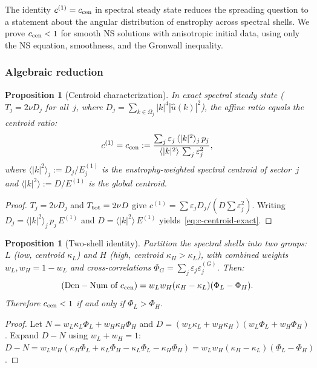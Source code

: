 \documentclass[11pt]{article}
\newtheorem{proposition}[theorem]{Proposition}
\theoremstyle{definition}
\begin{document}
The identity $c^{(1)} = c_{\rm cen}$ in spectral
steady state reduces the spreading question to a
statement about the angular distribution of enstrophy
across spectral shells.  We prove $c_{\rm cen}<1$
for smooth NS solutions with anisotropic initial
data, using only the NS equation, smoothness, and
the Gronwall inequality.

\subsubsection{Algebraic reduction}

\begin{proposition}[Centroid characterization]
\label{prop:c-centroid}
In exact spectral steady state
($T_j = 2\nu D_j$ for all~$j$, where
$D_j = \sum_{k\in\Omega_j}|k|^4|\hat u(k)|^2$),
the affine ratio equals the centroid ratio:
\begin{equation}\label{eq:c-centroid-exact}
c^{(1)} = c_{\rm cen} :=
\frac{\sum_j\varepsilon_j\,
\langle|k|^2\rangle_j\,p_j}
{\langle|k|^2\rangle\,
\sum_j\varepsilon_j^2},
\end{equation}
where
$\langle|k|^2\rangle_j := D_j/E_j^{(1)}$
is the enstrophy-weighted spectral centroid of
sector~$j$ and
$\langle|k|^2\rangle := D/E^{(1)}$ is the global
centroid.
\end{proposition}

\begin{proof}
$T_j = 2\nu D_j$ and $T_{\rm tot} = 2\nu D$ give
$c^{(1)} = \sum\varepsilon_j D_j/(D\sum\varepsilon_j^2)$.
Writing $D_j = \langle|k|^2\rangle_j\,p_j\,E^{(1)}$
and $D = \langle|k|^2\rangle\,E^{(1)}$
yields~\eqref{eq:c-centroid-exact}.
\end{proof}

\begin{proposition}[Two-shell identity]
\label{prop:two-shell}
Partition the spectral shells into two groups:
$L$ (low, centroid $\kappa_L$) and $H$ (high,
centroid $\kappa_H>\kappa_L$), with combined
weights $w_L,w_H=1-w_L$ and cross-correlations
$\Phi_G = \sum_j\varepsilon_j\varepsilon_j^{(G)}$.
Then:
\begin{equation}\label{eq:two-shell-id}
(\mathrm{Den}-\mathrm{Num}\text{ of }c_{\rm cen})
= w_L w_H(\kappa_H-\kappa_L)(\Phi_L-\Phi_H).
\end{equation}
Therefore $c_{\rm cen}<1$ if and only if $\Phi_L>\Phi_H$.
\end{proposition}

\begin{proof}
Let $N = w_L\kappa_L\Phi_L+w_H\kappa_H\Phi_H$
and $D = (w_L\kappa_L+w_H\kappa_H)(w_L\Phi_L+w_H\Phi_H)$.
Expand $D-N$ using $w_L+w_H=1$:
$D-N = w_Lw_H(\kappa_H\Phi_L+\kappa_L\Phi_H
-\kappa_L\Phi_L-\kappa_H\Phi_H)
= w_Lw_H(\kappa_H-\kappa_L)(\Phi_L-\Phi_H)$.
\end{proof}
\end{document}
